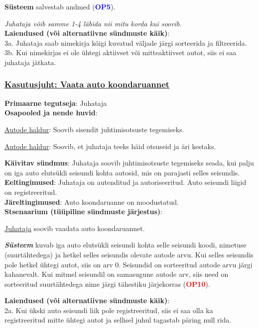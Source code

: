\begin{shaded}
\begin{myenumerate}
		\item \textbf{Süsteem} salvestab andmed (\textbf{\textcolor{blue}{OP5}}).
	\end{myenumerate}
	\textit{Juhataja võib samme 1-4 läbida nii mitu korda kui soovib. }\\
	\textbf{Laiendused  (või alternatiivne sündmuste käik)}: \\
	\indent 3a. Juhataja saab nimekirja kõigi kuvatud väljade järgi sorteerida ja filtreerida. \\
	\indent 3b. Kui nimekirjas ei ole ühtegi aktiivset või mitteaktiivset autot, siis ei saa juhataja jätkata.
\end{shaded}

\begin{shaded}
	\subsubsection{\underline{Kasutusjuht: Vaata auto koondaruannet}}
	\textbf{Primaarne tegutseja}: Juhataja \\
	\textbf{Osapooled ja nende huvid}: 
	\useDash
	\begin{myitemize}
		\item \underline{Autode haldur}: Soovib sisendit juhtimisotsuste tegemiseks.
		\item \underline{Autode haldur}: Soovib, et juhataja teeks häid otsuseid ja äri kestaks.
	\end{myitemize}
	\textbf{Käivitav sündmus}: Juhataja soovib juhtimisotsuste tegemiseks seada, kui palju on iga auto elutsükli seisundi kohta autosid, mis on parajasti selles seisundis. \\
	\textbf{Eeltingimused}: Juhataja on autenditud ja autoriseeritud. Auto seisundi liigid on registreeritud. \\
	\textbf{Järeltingimused}: Auto koondaruanne on moodustatud. \\
	\textbf{Stsenaarium (tüüpiline sündmuste järjestus)}:
	\begin{myenumerate}
		\item \underline{Juhataja} soovib vaadata auto koondaruannet.
		\item\textit \textbf{Süsteem} kuvab iga auto elutsükli seisundi kohta selle seisundi koodi, nimetuse (suurtähtedega) ja hetkel selles seisundis olevate autode arvu. Kui selles seisundis pole hetkel ühtegi autot, siis on arv 0. Seisundid on sorteeritud autode arvu järgi kahanevalt. Kui mitmel seisundil on samasugune autode arv, siis need on sorteeritud suurtähtedega nime järgi tähestiku järjekorras (\textbf{\textcolor{red}{OP10}}).
	\end{myenumerate}
	\textbf{Laiendused  (või alternatiivne sündmuste käik)}: \\
	\indent 2a. Kui ükski auto seisundi liik pole registreeritud, siis ei saa olla ka registreeritud mitte ühtegi autot ja sellisel juhul tagastab päring null rida. \\
\end{shaded}

